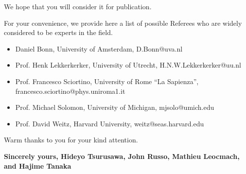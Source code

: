 \documentclass[11pt]{article}
\begin{document}
We hope that you will consider it for publication.



\vskip 0.3cm
For your convenience, we provide here a list of possible Referees who are widely considered to be experts in the field.
\begin{itemize}
\item Daniel Bonn, University of Amsterdam, D.Bonn@uva.nl
\item Prof. Henk Lekkerkerker, University of Utrecht, H.N.W.Lekkerkerker@uu.nl
\item Prof. Francesco Sciortino, University of Rome ``La Sapienza'', \\ francesco.sciortino@phys.uniroma1.it
\item Prof. Michael Solomon, University of Michigan, mjsolo@umich.edu
\item Prof. David Weitz, Harvard University, weitz­@seas.harvard.edu
\end{itemize}






\vskip 0.3cm
\noindent
Warm thanks to you for your kind attention.

\vskip 0.8cm

{\bf 
\noindent
Sincerely yours,
\vskip 0.3cm
\noindent
Hideyo Tsurusawa, John Russo, Mathieu Leocmach, \\ 
and Hajime Tanaka
}
\end{document}
